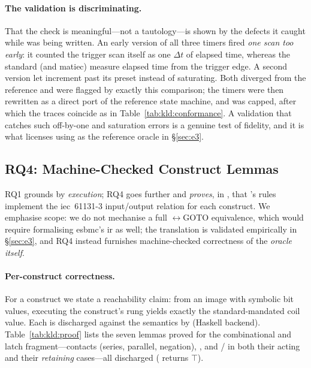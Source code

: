 \paragraph{The validation is discriminating.} That the check is meaningful---not a
tautology---is shown by the defects it caught while \kld{} was being written. An
early version of all three timers fired \emph{one scan too early}: it counted the
trigger scan itself as one $\Delta t$ of elapsed time, whereas the standard (and
\gls{matiec}) measure elapsed time from the trigger edge. A second version let
 increment past its preset instead of saturating. Both diverged from the
reference and were flagged by exactly this comparison; the timers were then
rewritten as a direct port of the reference state machine, and  was
capped, after which the traces coincide as in Table~\ref{tab:kld:conformance}. A
validation that catches such off-by-one and saturation errors is a genuine test of
fidelity, and it is what licenses using \kld{} as the reference oracle in
\S\ref{sec:e3}.

\subsection{RQ4: Machine-Checked Construct Lemmas}
\label{sec:eval:rq4}

RQ1 grounds \kld{} by \emph{execution}; RQ4 goes further and \emph{proves}, in
, that \kld{}'s rules implement the \gls{iec}~61131-3 input/output
relation for each construct. We emphasise scope: we do not mechanise a full
\kld{}$\leftrightarrow$GOTO equivalence, which would require formalising
\gls{esbmc}'s \gls{ir} as well; the translation is validated empirically in
\S\ref{sec:e3}, and RQ4 instead furnishes machine-checked correctness of the
\emph{oracle itself}.

\paragraph{Per-construct correctness.} For a construct we state a reachability
claim: from an image with symbolic bit values, executing the construct's rung
yields exactly the standard-mandated coil value. Each is discharged against the
semantics by  (Haskell backend). Table~\ref{tab:kld:proof} lists the
seven lemmas proved for the combinational and latch fragment---contacts (series,
parallel, negation), , and / in both their acting and
their \emph{retaining} cases---all discharged ( returns
$\top$).

